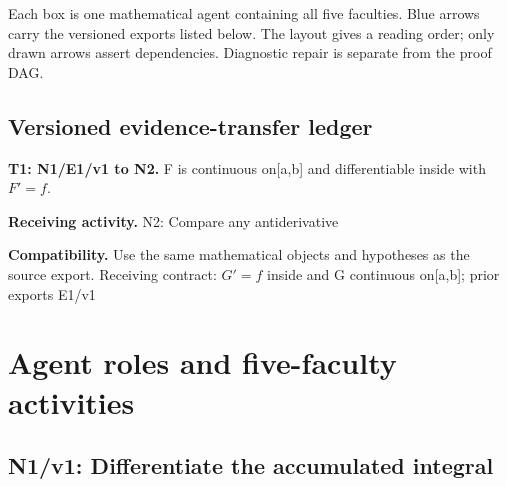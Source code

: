 \documentclass[preprint,12pt,aps,pra,showkeys,amsmath,amssymb,superscriptaddress,floatfix]{revtex4-2}
\theoremstyle{definition}
\theoremstyle{remark}
\newcommand{\field}[2]{\par\smallskip\noindent\textbf{#1.} #2\par}
\begin{document}
\begin{center}\end{center}

Each box is one mathematical agent containing all five faculties. Blue
arrows carry the versioned exports listed below. The layout gives a
reading order; only drawn arrows assert dependencies. Diagnostic repair
is separate from the proof DAG.

\subsection{Versioned evidence-transfer ledger}

\begingroup\small\linespread{1.05}\selectfont

\field{T1: N1/E1/v1 to N2}{F is continuous on{[}a,b{]} and differentiable inside with \(F'=f\).}

\field{Receiving activity}{N2: Compare any antiderivative}

\field{Compatibility}{Use the same mathematical objects and hypotheses as the source export.
Receiving contract: \(G'=f\) inside and G continuous on{[}a,b{]}; prior
exports E1/v1}

\endgroup

\clearpage\section{Agent roles and five-faculty activities}\begingroup\small\linespread{1.05}\selectfont{}

\subsection{N1/v1: Differentiate the accumulated integral}
\end{document}
